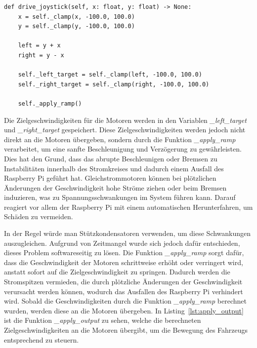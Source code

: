     \begin{lstlisting}[caption={Funktion zur Steuerung des Fahrzeugs über den Joystick}, label={lst:drive_joystick}]
def drive_joystick(self, x: float, y: float) -> None:
    x = self._clamp(x, -100.0, 100.0)
    y = self._clamp(y, -100.0, 100.0)

    left = y + x
    right = y - x

    self._left_target = self._clamp(left, -100.0, 100.0)
    self._right_target = self._clamp(right, -100.0, 100.0)

    self._apply_ramp()
    \end{lstlisting}

    Die Zielgeschwindigkeiten für die Motoren werden in den Variablen \emph{\_left\_target} und \emph{\_right\_target} gespeichert. Diese Zielgeschwindigkeiten werden jedoch nicht direkt an die Motoren übergeben, sondern durch die Funktion \emph{\_apply\_ramp} verarbeitet, um eine sanfte Beschleunigung und Verzögerung zu gewährleisten. Dies hat den Grund, dass das abrupte Beschleunigen oder Bremsen zu Instabilitäten innerhalb des Stromkreises und dadurch einem Ausfall des Raspberry Pi geführt hat. Gleichstrommotoren können bei plötzlichen Änderungen der Geschwindigkeit hohe Ströme ziehen oder beim Bremsen induzieren, was zu Spannungsschwankungen im System führen kann. Darauf reagiert vor allem der Raspberry Pi mit einem automatischen Herunterfahren, um Schäden zu vermeiden. 

    In der Regel würde man Stützkondensatoren verwenden, um diese Schwankungen auszugleichen. Aufgrund von Zeitmangel wurde sich jedoch dafür entschieden, dieses Problem softwareseitig zu lösen. Die Funktion \emph{\_apply\_ramp} sorgt dafür, dass die Geschwindigkeit der Motoren schrittweise erhöht oder verringert wird, anstatt sofort auf die Zielgeschwindigkeit zu springen. Dadurch werden die Stromspitzen vermieden, die durch plötzliche Änderungen der Geschwindigkeit verursacht werden können, wodurch das Ausfallen des Raspberry Pi verhindert wird. Sobald die Geschwindigkeiten durch die Funktion \emph{\_apply\_ramp} berechnet wurden, werden diese an die Motoren übergeben. In Listing~\ref{lst:apply_output} ist die Funktion \emph{\_apply\_output} zu sehen, welche die berechneten Zielgeschwindigkeiten an die Motoren übergibt, um die Bewegung des Fahrzeugs entsprechend zu steuern.

